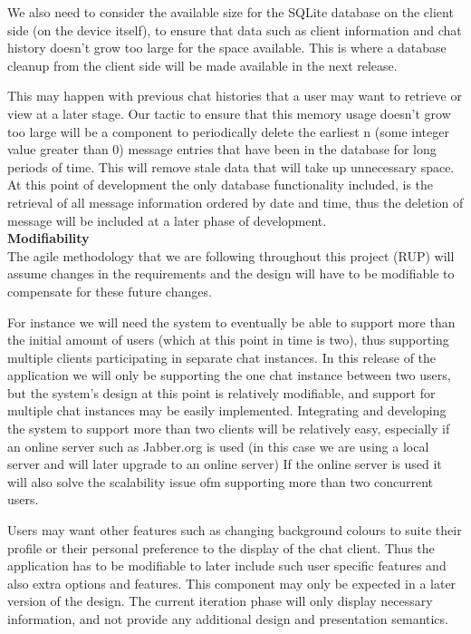 \documentclass[29pt,a4paper]{moderncv}
\begin{document}
				We also need to consider the available size for the SQLite database on the client side (on the device itself), to ensure that data such as client information and chat history doesn’t grow too large for the space available. This is where a database cleanup from the client side will be made available in the next release.
				
				This may happen with previous chat histories that a user may want to retrieve or view at a later stage. Our tactic to ensure that this memory usage doesn’t grow too large will be a component to periodically delete the earliest n (some integer value greater than 0) message entries that have been in the database for long periods of time. This will remove stale data that will take up unnecessary space.  At this point of development the only database functionality included, is the retrieval of all message information ordered by date and time, thus the deletion of message will be included at a later phase of development.\\
			
			\noindent\textbf{Modifiability}\\
			The agile methodology that we are following throughout this project (RUP) will assume changes in the requirements and the design will have to be modifiable to compensate for these future changes.
			
			For instance we will need the system to eventually be able to support more than the initial amount of users (which at this point in time is two), thus supporting multiple clients participating in separate chat instances.  In this release of the application we will only be supporting the one chat instance between two users, but the system’s design at this point is relatively modifiable, and support for multiple chat instances may be easily implemented. Integrating and developing the system to support more than two clients will be relatively easy, especially if an online server such as Jabber.org is used (in this case we are using a local server and will later upgrade to an online server) If the online server is used it will also solve the scalability issue ofm supporting more than two concurrent users.
			
			Users may want other features such as changing background colours to suite their profile or their personal preference to the display of the chat client. Thus the application has to be modifiable to later include such user specific features and also extra options and features.  This component may only be expected in a later version of the design.  The current iteration phase will only display necessary information, and not provide any additional design and presentation semantics.
			\\  			
			
\end{document}
